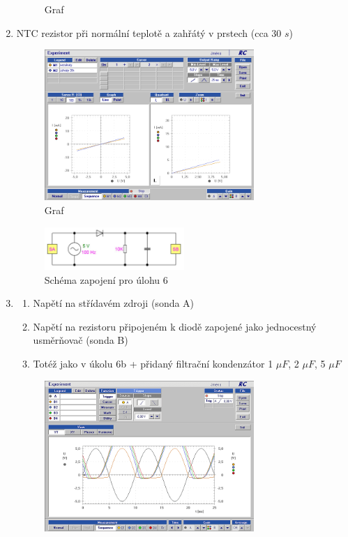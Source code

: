 \documentclass[a4paper]{article}
\begin{document}
\begin{enumerate}
\begin{figure}[H]
		\caption{Graf}
		\label{fig:mesh3}
	\end{figure}
	\item NTC rezistor při normální teplotě a zahřátý v prstech (cca 30 $s$)
	\begin{figure}[H]
		\centering
		\includegraphics[width=0.75\textwidth]{9leden/NTCrezistor.png}
		\caption{Graf}
		\label{fig:mesh5}
	\end{figure}
	\begin{figure}[H]
		\centering
		\includegraphics[width=0.5\textwidth]{zapojeni2.png}
		\caption{Schéma zapojení pro úlohu 6}
		\label{fig:mesh6}
	\end{figure}
	\item\begin{enumerate}
		\item Napětí na střídavém zdroji (sonda A)
		\item Napětí na rezistoru připojeném k diodě zapojené jako jednocestný usměrňovač (sonda B)
		\item Totéž jako v úkolu 6b + přidaný filtrační kondenzátor 1 $\mu F$, 2 $\mu F$, 5 $\mu F$
	\end{enumerate}
	\begin{figure}[H]
		\centering
		\includegraphics[width=0.75\textwidth]{6..png}

\end{figure}
\end{enumerate}
\end{document}

